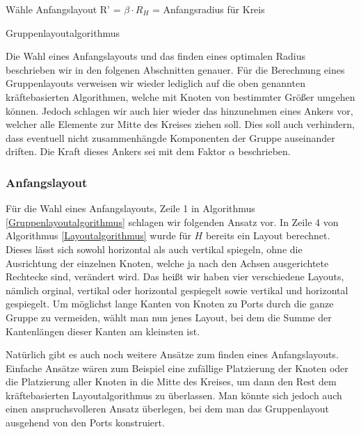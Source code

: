 \begin{algorithm}[H]
\label{Gruppenlayoutalgorithmus}
\SetAlgoLined
{} 
Wähle Anfangslayout\;
R' = $\beta \cdot R_H$ = Anfangsradius für Kreis\;
\caption{Gruppenlayoutalgorithmus}
\end{algorithm}

Die Wahl eines Anfangslayouts und das finden eines optimalen Radius beschrieben wir  in den folgenen Abschnitten  genauer. 
Für die Berechnung eines Gruppenlayouts verweisen wir wieder lediglich auf die oben genannten kräftebasierten Algorithmen, welche mit Knoten von bestimmter Größer umgehen können. 
Jedoch schlagen wir auch hier wieder das hinzunehmen eines Ankers vor, welcher alle Elemente zur Mitte des Kreises ziehen soll. Dies soll auch verhindern, dass eventuell nicht zusammenhängde Komponenten der Gruppe auseinander driften. Die Kraft dieses Ankers sei mit dem Faktor $\alpha$ beschrieben. 

\subsubsection{Anfangslayout}
Für die Wahl eines Anfangslayouts, Zeile 1 in Algorithmus \ref{Gruppenlayoutalgorithmus} schlagen wir folgenden Ansatz vor.
In Zeile 4 von Algorithmus \ref{Layoutalgorithmus} wurde für $H$ bereits ein Layout berechnet. Dieses lässt sich sowohl horizontal als auch vertikal spiegeln, ohne die Ausrichtung der einzelnen Knoten, welche ja nach den Achsen ausgerichtete Rechtecke sind, verändert wird. Das heißt wir haben vier verschiedene Layouts, nämlich orginal, vertikal oder horizontal gespiegelt sowie vertikal und horizontal gespiegelt. Um möglichst lange Kanten von Knoten zu Ports durch die ganze Gruppe zu vermeiden, wählt man nun jenes Layout, bei dem die Summe der Kantenlängen dieser Kanten am kleinsten ist. %


Natürlich gibt es auch noch weitere Ansätze zum finden eines Anfangslayouts.
Einfache Ansätze wären zum Beispiel eine zufällige Platzierung der Knoten oder die Platzierung aller Knoten in die Mitte des Kreises, um dann den Rest dem kräftebasierten Layoutalgorithmus zu überlassen. Man könnte sich jedoch auch einen anspruchsvolleren Ansatz überlegen, bei dem man das Gruppenlayout ausgehend von den Ports konstruiert.


